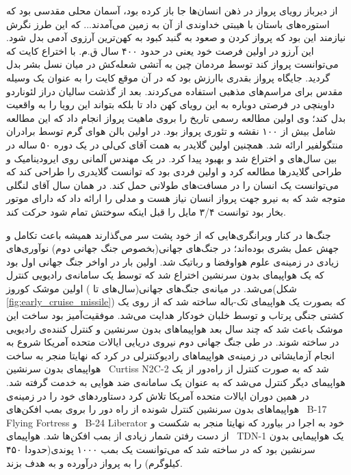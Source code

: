 از دیرباز رویای پرواز در ذهن انسان‌ها جا باز کرده بود، آسمان محلی مقدسی بود که استوره‌های باستان با هیبتی خداوندی از آن به زمین می‌آمدند... که این طرز نگرش نیازمند این بود که پرواز کردن و صعود به گنبد کبود به کهن‌ترین آرزوی آدمی بدل شود. این آرزو در اولین فرصت خود یعنی در حدود ۴۰۰ سال ق.م. با اختراع کایت که می‌توانست پرواز کند توسط مردمان چین به آتشی شعله‌کش در میان نسل بشر بدل گردید. جایگاه پرواز بقدری باارزش بود که در آن موقع کایت را به عنوان یک وسیله مقدس برای مراسم‌های مذهبی استفاده می‌کردند. بعد از گذشت سالیان دراز لئوناردو داوینچی در  فرصتی دوباره به این رویای کهن داد تا بلکه بتواند این رویا را به واقعیت بدل کند؛ وی اولین مطالعه رسمی تاریخ را بروی ماهیت پرواز انجام داد که این مطالعه شامل بیش از ۱۰۰ نقشه و تئوری پرواز بود. در  اولین بالن هوای گرم توسط برادران منتگولفیر ارائه شد. همچنین اولین گلایدر به همت آقای کی‌لی در یک دوره ۵۰ ساله در بین سال‌های  و  اختراع شد و بهبود پیدا کرد. در  یک مهندس آلمانی روی ایرودینامیک و طراحی گلایدرها مطالعه کرد و اولین فردی بود که توانست گلایدری را طراحی کند که می‌توانست یک انسان را در مسافت‌های طولانی حمل کند. در همان سال آقای لنگلی متوجه شد که به نیرو جهت پرواز انسان نیاز هست و مدلی را ارائه داد که دارای موتور بخار بود توانست ۳/۴ مایل را قبل اینکه سوختش تمام شود حرکت کند.

جنگ‌ها در کنار ویرانگری‌هایی که از خود پشت سر می‌گذارند همیشه باعث تکامل و جهش عمل بشری بوده‌اند؛ در جنگ‌های جهانی(بخصوص جنگ جهانی دوم) نوآوری‌های زیادی در زمینه‌ی علوم هواوفضا و رباتیک شد. اولین بار در اواخر جنگ جهانی اول بود که یک هواپیمای بدون سرنشین اختراع شد که توسط یک سامانه‌ی رادیویی کنترل می‌شد. در میانه‌ی جنگ‌های جهانی(سال‌های  تا ) اولین موشک کوروز(شکل \ref{fig:early_cruise_missile}) که بصورت یک هواپیمای تک-باله ساخته شد که از روی یک کشتی جنگی پرتاب و توسط خلبان خودکار هدایت می‌شد. موفقیت‌آمیز بود ساخت این موشک باعث شد که چند سال بعد هواپیماهای بدون سرنشین و کنترل کننده‌ی رادیویی در  ساخته شوند. در طی جنگ جهانی دوم نیروی دریایی ایالات متحده آمریکا شروع به انجام آزمایشاتی در زمینه‌ی هواپیما‌های رادیوکنترلی در  کرد که نهایتا منجر به ساخت هواپیمای بدون سرنشین \ {Curtiss N2C-2} شد که به صورت کنترل از راه‌دور از یک هواپیمای دیگر کنترل می‌شد که به عنوان یک سامانه‌ی ضد هوایی به خدمت گرفته شد. در همین دوران ایالات متحده آمریکا تلاش کرد دستاوردهای خود را در زمینه‌ی هواپیماهای بدون سرنشین کنترل شونده از راه دور را بروی بمب افکن‌های \ {B-17 Flying Fortress} و \ {B-24 Liberator} خود به اجرا در بیاورد که نهایتا منجر به شکست و از دست رفتن شمار زیادی از بمب افکن‌ها شد. هواپیمای \ {TDN-1} یک هواپیمایی بدون سرنشین بود که در  ساخته شد که می‌توانست یک بمب ۱۰۰۰ پوندی(حدودا ۴۵۰ کیلوگرم) را به پرواز درآورده و به هدف بزند.


